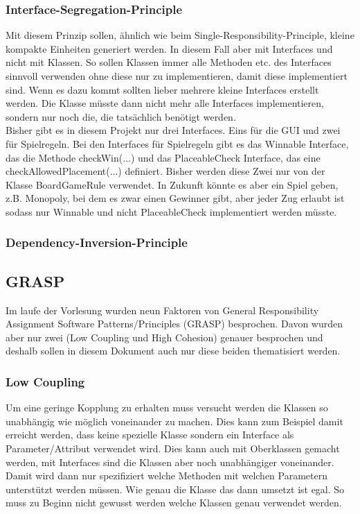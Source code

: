 \documentclass[12pt]{article}
\begin{document}
\subsubsection{Interface-Segregation-Principle}
Mit diesem Prinzip sollen, ähnlich wie beim Single-Responsibility-Principle, kleine kompakte Einheiten generiert werden. In diesem Fall aber mit Interfaces und nicht mit Klassen. So sollen Klassen immer alle Methoden etc. des Interfaces sinnvoll verwenden ohne diese nur zu implementieren, damit diese implementiert sind. Wenn es dazu kommt sollten lieber mehrere kleine Interfaces erstellt werden. Die Klasse müsste dann nicht mehr alle Interfaces implementieren, sondern nur noch die, die tatsächlich benötigt werden.
\\

Bisher gibt es in diesem Projekt nur drei Interfaces. Eins für die GUI und zwei für Spielregeln. Bei den Interfaces für Spielregeln gibt es das Winnable Interface, das die Methode checkWin(...) und das PlaceableCheck Interface, das eine checkAllowedPlacement(...) definiert. Bisher werden diese Zwei nur von der Klasse BoardGameRule verwendet. In Zukunft könnte es aber ein Spiel geben, z.B. Monopoly, bei dem es zwar einen Gewinner gibt, aber jeder Zug erlaubt ist sodass nur Winnable und nicht PlaceableCheck implementiert werden müsste.



\subsubsection{Dependency-Inversion-Principle}




\subsection{GRASP}
Im laufe der Vorlesung wurden neun Faktoren von General Responsibility Assignment Software Patterns/Principles (GRASP) besprochen. Davon wurden aber nur zwei (Low Coupling und High Cohesion) genauer besprochen und deshalb sollen in diesem Dokument auch nur diese beiden thematisiert werden.


\subsubsection{Low Coupling}
Um eine geringe Kopplung zu erhalten muss versucht werden die Klassen so unabhängig wie möglich voneinander zu machen. Dies kann zum Beispiel damit erreicht werden, dass keine spezielle Klasse sondern ein Interface als Parameter/Attribut verwendet wird. Dies kann auch mit Oberklassen gemacht werden, mit Interfaces sind die Klassen aber noch unabhängiger voneinander. Damit wird dann nur spezifiziert welche Methoden mit welchen Parametern unterstützt werden müssen. Wie genau die Klasse das dann umsetzt ist egal. So muss zu Beginn nicht gewusst werden welche Klassen genau verwendet werden. 
\\
\end{document}
